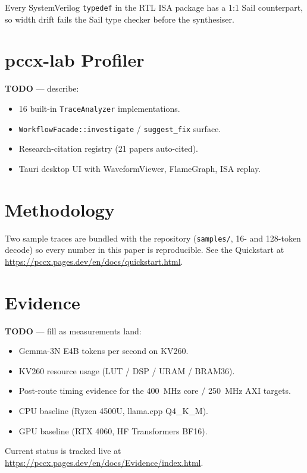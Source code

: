 \documentclass[11pt,a4paper]{article}
\begin{document}
Every SystemVerilog \texttt{typedef} in the RTL ISA package has a
1:1 Sail counterpart, so width drift fails the Sail type checker
before the synthesiser.

\section{pccx-lab Profiler}
\label{sec:lab}

\textbf{TODO} — describe:
\begin{itemize}
  \item 16 built-in \texttt{TraceAnalyzer} implementations.
  \item \texttt{WorkflowFacade::investigate} / \texttt{suggest\_fix} surface.
  \item Research-citation registry (21 papers auto-cited).
  \item Tauri desktop UI with WaveformViewer, FlameGraph, ISA replay.
\end{itemize}

\section{Methodology}
\label{sec:method}

Two sample traces are bundled with the repository
(\texttt{samples/}, 16- and 128-token decode) so every number in this
paper is reproducible.  See the Quickstart at
\url{https://pccx.pages.dev/en/docs/quickstart.html}.

\section{Evidence}
\label{sec:evidence}

\textbf{TODO} — fill as measurements land:
\begin{itemize}
  \item Gemma-3N E4B tokens per second on KV260.
  \item KV260 resource usage (LUT / DSP / URAM / BRAM36).
  \item Post-route timing evidence for the 400~MHz core / 250~MHz AXI targets.
  \item CPU baseline (Ryzen 4500U, llama.cpp Q4\_K\_M).
  \item GPU baseline (RTX 4060, HF Transformers BF16).
\end{itemize}

Current status is tracked live at
\url{https://pccx.pages.dev/en/docs/Evidence/index.html}.
\end{document}
